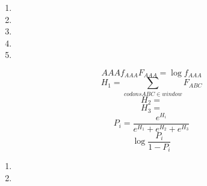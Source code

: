 \documentclass{homework}
\date{Montag, dem 3. Dezember 2012}
\author{Stefan Meißner (4279113) und Niels Hoppe (4356370)}
\begin{document}
\maketitle
\begin{enumerate} 

\begin{enumerate}
\item
\item
\item
\item
\item 
\end{enumerate}

$$AAA f_{AAA} F_{AAA} = \log f_{AAA}$$
$$H_1 = \sum_{codons ABC \in window} F_{ABC}$$
$$H_2 = $$
$$H_3 = $$
$$P_i = \frac{e^{H_i}}{e^{H_1} + e^{H_2} + e^{H_3}}$$
$$\log \frac{P_i}{1-P_i}$$



\begin{enumerate}
\item
\item
\end{enumerate}



\end{enumerate}
\end{document}
